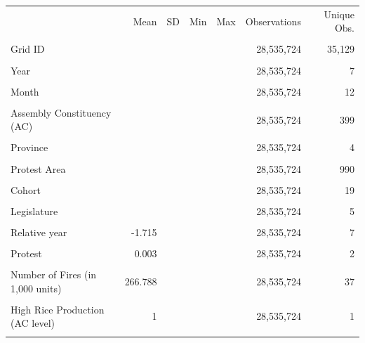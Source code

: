 \begin{tabular}{lrrrrrr}
\toprule
 & Mean & SD & Min & Max & Observations & Unique Obs.\\\\
\midrule
Grid ID &  &  &  &  & 28,535,724 & 35,129\\\\
Year &  &  &  &  & 28,535,724 & 7\\\\
Month &  &  &  &  & 28,535,724 & 12\\\\
Assembly Constituency (AC) &  &  &  &  & 28,535,724 & 399\\\\
Province &  &  &  &  & 28,535,724 & 4\\\\
Protest Area &  &  &  &  & 28,535,724 & 990\\\\
Cohort &  &  &  &  & 28,535,724 & 19\\\\
Legislature &  &  &  &  & 28,535,724 & 5\\\\
Relative year & -1.715 &  &  &  & 28,535,724 & 7\\\\
Protest & 0.003 &  &  &  & 28,535,724 & 2\\\\
Number of Fires (in 1,000 units) & 266.788 &  &  &  & 28,535,724 & 37\\\\
High Rice Production (AC level) & 1 &  &  &  & 28,535,724 & 1\\\\
\bottomrule
\end{tabular}
